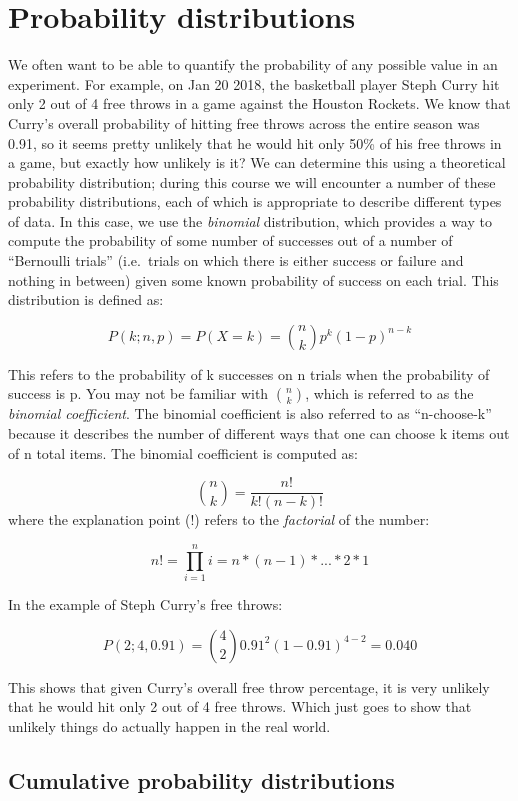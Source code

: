\documentclass[]{book}
\theoremstyle{definition}
\theoremstyle{definition}
\theoremstyle{definition}
\theoremstyle{remark}
\begin{document}
\section{Probability distributions}\label{probability-distributions}

We often want to be able to quantify the probability of any possible
value in an experiment. For example, on Jan 20 2018, the basketball
player Steph Curry hit only 2 out of 4 free throws in a game against the
Houston Rockets. We know that Curry's overall probability of hitting
free throws across the entire season was 0.91, so it seems pretty
unlikely that he would hit only 50\% of his free throws in a game, but
exactly how unlikely is it? We can determine this using a theoretical
probability distribution; during this course we will encounter a number
of these probability distributions, each of which is appropriate to
describe different types of data. In this case, we use the
\emph{binomial} distribution, which provides a way to compute the
probability of some number of successes out of a number of ``Bernoulli
trials'' (i.e.~trials on which there is either success or failure and
nothing in between) given some known probability of success on each
trial. This distribution is defined as:

\[
P(k; n,p) = P(X=k) = \binom{n}{k} p^k(1-p)^{n-k}
\]

This refers to the probability of k successes on n trials when the
probability of success is p. You may not be familiar with
\(\binom{n}{k}\), which is referred to as the \emph{binomial
coefficient}. The binomial coefficient is also referred to as
``n-choose-k'' because it describes the number of different ways that
one can choose k items out of n total items. The binomial coefficient is
computed as:

\[
\binom{n}{k} = \frac{n!}{k!(n-k)!}
\] where the explanation point (!) refers to the \emph{factorial} of the
number:

\[
n! = \prod_{i=1}^n i = n*(n-1)*...*2*1 
\]

In the example of Steph Curry's free throws:

\[
P(2;4,0.91) = \binom{4}{2} 0.91^2(1-0.91)^{4-2} = 0.040
\]

This shows that given Curry's overall free throw percentage, it is very
unlikely that he would hit only 2 out of 4 free throws. Which just goes
to show that unlikely things do actually happen in the real world.

\subsection{Cumulative probability
distributions}\label{cumulative-probability-distributions}
\end{document}
